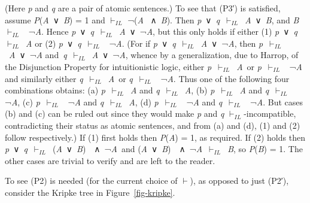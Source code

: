 \documentclass[
  10pt,
  letterpaper,
  DIV=11,
  numbers=noendperiod,
  twoside]{scrartcl}
\begin{document}
(Here \emph{p} and \emph{q} are a pair of atomic sentences.) To see that
(P3′) is satisfied, assume \emph{P}(\emph{A}~∨~\emph{B}) = 1 and
\(\vdash_{IL}\) ¬(\emph{A} ~∧~\emph{B}). Then
\emph{p}~∨~\emph{q}~\(\vdash_{IL}\)~\emph{A}~∨~\emph{B}, and
\emph{B}~\(\vdash_{IL}\)~ ¬\emph{A}. Hence
\emph{p}~∨~\emph{q}~\(\vdash_{IL}\)~\emph{A}~∨~¬\emph{A}, but this only
holds if either (1) \emph{p}~∨~\emph{q}~\(\vdash_{IL}\)~\emph{A} or (2)
\emph{p}~∨~\emph{q}~\(\vdash_{IL}\)~ ¬\emph{A}. (For if
\emph{p}~∨~\emph{q}~\(\vdash_{IL}\)~\emph{A}~∨~¬\emph{A}, then
\emph{p}~\(\vdash_{IL}\)~\emph{A}~∨~¬\emph{A}
and~\emph{q}~\(\vdash_{IL}\)~\emph{A}~∨~¬\emph{A}, whence by a
generalization, due to Harrop, of the Disjunction Property for
intuitionistic logic, either \emph{p}~\(\vdash_{IL}\)~\emph{A}~or
\emph{p}~\(\vdash_{IL}\)~ ¬\emph{A} and similarly either
\emph{q}~\(\vdash_{IL}\)~\emph{A}~or \emph{q}~\(\vdash_{IL}\)~
¬\emph{A}. Thus one of the following four combinations obtains: (a)
\emph{p}~\(\vdash_{IL}\)~\emph{A} and \emph{q}~\(\vdash_{IL}\)~\emph{A},
(b) \emph{p}~\(\vdash_{IL}\)~\emph{A} and \emph{q}~\(\vdash_{IL}\)~
¬\emph{A}, (c) \emph{p}~\(\vdash_{IL}\)~ ¬\emph{A} and
\emph{q}~\(\vdash_{IL}\)~\emph{A}, (d) \emph{p}~\(\vdash_{IL}\)~
¬\emph{A} and \emph{q}~\(\vdash_{IL}\)~ ¬\emph{A}. But cases (b) and (c)
can be ruled out since they would make \emph{p} and \emph{q}
\(\vdash_{IL}\)-incompatible, contradicting their status as atomic
sentences, and from (a) and (d), (1) and (2) follow respectively.) If
(1) first holds then \emph{P}(\emph{A}) = 1, as required. If (2) holds
then
\emph{p}~∨~\emph{q}~\(\vdash_{IL}\)~(\emph{A}~∨~\emph{B})~~∧~¬\emph{A}~and
(\emph{A}~∨~\emph{B})~~∧~¬\emph{A}~\(\vdash_{IL}\)~\emph{B}, so
\emph{P}(\emph{B}) = 1. The other cases are trivial to verify and are
left to the reader.

To see (P2) is needed (for the current choice of \(\vdash\)), as opposed
to just (P2′), consider the Kripke tree in Figure~\ref{fig-kripke}.
\end{document}

